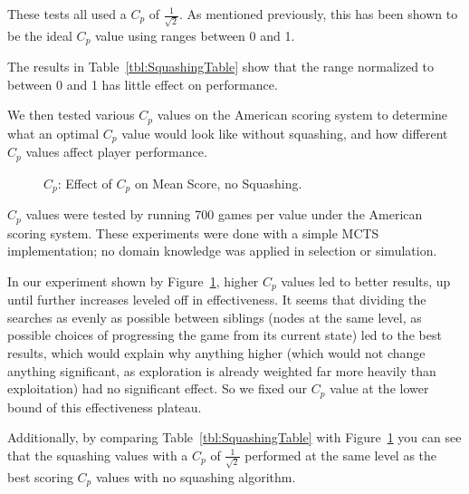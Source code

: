 \documentclass[letterpaper]{article}
\begin{document}
These tests all used a  $C_p$ of $\frac{1}{\sqrt{2}}$. As mentioned previously, this has been shown to be the ideal  $C_p$ value using ranges between 0 and 1.

The results in Table~\ref{tbl:SquashingTable} show that the range normalized to between 0 and 1 has little effect on performance.

We then tested various $C_p$ values on the American scoring system to determine what an optimal $C_p$ value would look like without squashing, and how different $C_p$ values affect player performance.

\begin{figure}
\begin{center}
\end{center}
\caption{$C_p$: Effect of $C_p$ on Mean Score, no Squashing.}
\label{fig:CPEXP}
\end{figure}

$C_p$ values were tested by running 700 games per value under the American scoring system. These experiments were done with a simple MCTS implementation; no domain knowledge was applied in selection or simulation. 

In our experiment shown by Figure~\ref{fig:CPEXP}, higher $C_p$ values  led to better results, up until further increases leveled off in effectiveness. It seems that dividing the searches as evenly as possible between siblings (nodes at the same level, as possible choices of progressing the game from its current state) led to the best results, which would explain why anything higher (which would not change anything significant, as exploration is already weighted far more heavily than exploitation) had no significant effect. So we fixed our $C_p$ value at the lower bound of this effectiveness plateau.

Additionally, by comparing Table~\ref{tbl:SquashingTable} with Figure~\ref{fig:CPEXP} you can see that the squashing values with a  $C_p$ of $\frac{1}{\sqrt{2}}$ performed at the same level as the best scoring  $C_p$ values with no squashing algorithm. 
\end{document}
